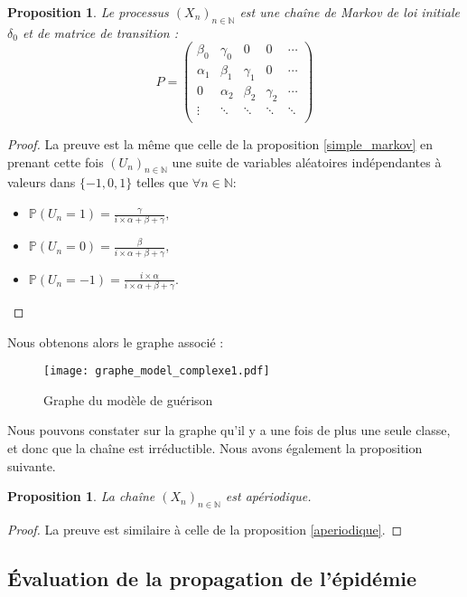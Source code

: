 \documentclass[12pt,a4paper]{report}
\newtheorem{prop}[thm]{Proposition}
\theoremstyle{remark}
\begin{document}
\begin{prop}
Le processus $(X_n)_{n \in \mathbb{N}}$ est une chaîne de Markov de loi initiale $\delta_0$ et de matrice de transition :
$$P=
\begin{pmatrix}
        \beta_0 & \gamma_0 & 0 & 0 & \cdots \\ 
         \alpha_1 & \beta_1 & \gamma_1 & 0 & \cdots\\
         0 & \alpha_2 & \beta_2 & \gamma_2 & \cdots\\
        \vdots &\ddots & \ddots & \ddots & \ddots \\ 
\end{pmatrix}$$
\end{prop}
\begin{proof}
La preuve est la même que celle de la proposition \ref{simple_markov} en prenant cette fois $(U_n)_{n\in \mathbb{N}}$ une suite de variables aléatoires indépendantes à valeurs dans $\{-1, 0, 1\}$ telles que $\forall n \in \mathbb{N}$: \\
\begin{itemize}
    \item $\mathbb{P}(U_n=1)= \frac{\gamma}{i \times \alpha+\beta+\gamma},$
    \item $\mathbb{P}(U_n=0)= \frac{\beta}{i \times \alpha+\beta+\gamma},$
    \item $\mathbb{P}(U_n=-1)= \frac{i \times \alpha}{i \times \alpha+\beta+\gamma}.$
\end{itemize}
\end{proof}


Nous obtenons alors le graphe associé :
\begin{figure}[h!]
    \centering
    \texttt{[image: graphe\_model\_complexe1.pdf]} 
   \caption{Graphe du modèle de guérison}
    \label{fig:graph}
\end{figure}
Nous pouvons constater sur la graphe qu'il y a une fois de plus une seule classe, et donc que la chaîne est irréductible. Nous avons également la proposition suivante.
\begin{prop}\label{aperiodique_guerison}
La chaîne $(X_n)_{n \in \mathbb{N}}$ est apériodique.
\end{prop}
\begin{proof}
La preuve est similaire à celle de la proposition \ref{aperiodique}.
\end{proof}

\subsection{Évaluation de la propagation de l'épidémie}
\vspace{0.6cm}
\end{document}
